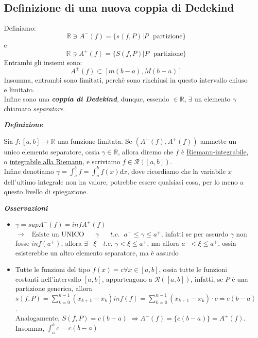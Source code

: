 \documentclass{article}
\theoremstyle{definition}
\newcommand{\R}{\mathbb{R}}
\begin{document}
\subsection{Definizione di una nuova coppia di Dedekind}
Definiamo:
\begin{equation*}
   \R \owns A^-(f)=\{s(f,P) | P \,\,\,\, \mbox{partizione}\}
\end{equation*}
e
\begin{equation*}
   \R \owns A^+(f)=\{S(f,P) | P \,\,\,\, \mbox{partizione}\}
\end{equation*}
Entrambi gli insiemi sono:
\begin{equation*}
    A^\pm (f) \subset [m(b-a), M(b-a)]
\end{equation*}
Insomma, entrambi sono limitati, perchè sono rinchiusi in questo intervallo chiuso e limitato.
\\
Infine sono una \textbf{\textit{coppia di Dedekind}}, dunque, essendo $ \in \R$, $\exists$ un elemento $\gamma$ chiamato \textit{separatore}.
\begin{center}
    \textbf{\textit{Definizione}}
\end{center}
Sia $f: [a,b] \to \R$ una funzione limitata. Se $(A^-(f),A^+(f))$ ammette un unico elemento separatore, ossia $\gamma \in \R$, allora diremo che $f$ è \underline{Riemann-integrabile}, o \underline{integrabile alla Riemann}, e scriviamo $f \in \mathcal{R} ([a,b])$.
\\
Infine denotiamo $\gamma= \int_a^b f= \int_a^b f(x) dx$, dove ricordiamo che la variabile $x$ dell'ultimo integrale non ha valore, potrebbe essere qualsiasi cosa, per lo meno a questo livello di spiegazione.
\\
\begin{center}
    \textbf{\textit{Osservazioni}}
\end{center}
\begin{itemize}
    \item $\gamma= supA^-(f)=infA^+(f)$ \,\,\,\,\, $\longrightarrow \,\,\,\,\, \mbox{Esiste un UNICO }\,\,\,\,\,\,\,\,\gamma\,\,\,\,\,\,\,\,\,\, t.c. \,\,\,\, a^- \leqslant \gamma \leqslant a^+ $, infatti se per assurdo $\gamma$ non fosse $inf(a^+)$, allora $\exists \,\,\,\,\, \xi \,\,\,\,\,\, t.c. \,\, \gamma < \xi \leqslant a^+$, ma allora $a^- < \xi \leqslant a^+$, ossia esisterebbe un altro elemento separatore, ma è assurdo
    \item Tutte le funzioni del tipo $f(x)=c \forall x \in [a,b]$, ossia tutte le funzioni costanti nell'intervallo $[a,b]$, appartengono a $\mathcal{R}([a,b])$, infatti, se $P$ è una partizione generica, allora $s(f,P)=\sum_{k=0}^{n-1}(x_{k+1}-x_k) inf(f)=\sum_{k=0}^{n-1}(x_{k+1}-x_k) \cdot c = c(b-a)$.
    \\
    Analogamente, $S(f,P)= c(b-a) \,\, \Longrightarrow A^-(f) = \{c(b-a)\}=A^+(f)$.
    \\
    Insomma, $\int_a^b c = c(b-a)$
\end{itemize}
\end{document}

